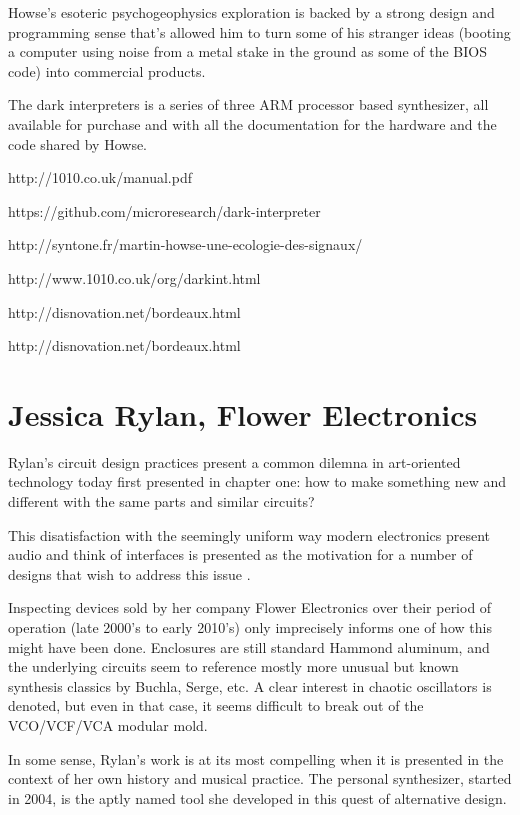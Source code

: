 Howse's esoteric psychogeophysics exploration is backed by a strong design and programming sense that's allowed him to turn some of his stranger ideas (booting a computer using noise from a metal stake in the ground as some of the BIOS code) into commercial products. 

The dark interpreters is a series of three ARM processor based synthesizer, all available for purchase and with all the documentation for the hardware and the code shared by Howse.  


http://1010.co.uk/manual.pdf

https://github.com/microresearch/dark-interpreter

http://syntone.fr/martin-howse-une-ecologie-des-signaux/

http://www.1010.co.uk/org/darkint.html

http://disnovation.net/bordeaux.html

http://disnovation.net/bordeaux.html

\section{Jessica Rylan, Flower Electronics}

Rylan's circuit design practices present a common dilemna in art-oriented technology today first presented in chapter one: how to make something new and different with the same parts and similar circuits? 

This disatisfaction with the seemingly uniform way modern electronics present audio and think of interfaces is presented as the motivation for a number of designs that wish to address this issue \citep[pp.139-155]{rodgers2010}. 

Inspecting devices sold by her company Flower Electronics over their period of operation (late 2000's to early 2010's) only imprecisely informs one of how this might have been done. Enclosures are still standard Hammond aluminum, and the underlying circuits seem to reference mostly more unusual but known synthesis classics by Buchla, Serge, etc. A clear interest in chaotic oscillators is denoted, but even in that case, it seems difficult to break out of the VCO/VCF/VCA modular mold. 

In some sense, Rylan's work is at its most compelling when it is presented in the context of her own history and musical practice. The personal synthesizer, started in 2004, is the aptly named tool she developed in this quest of alternative design. 

